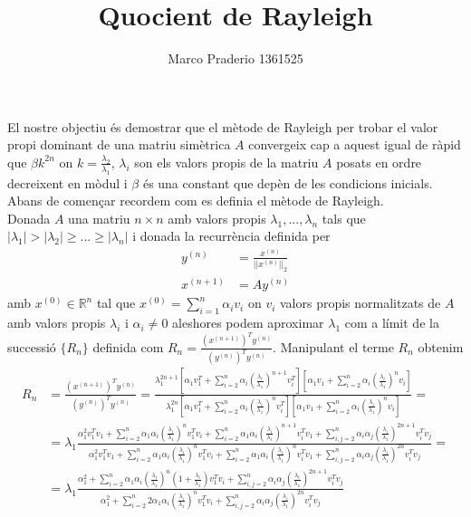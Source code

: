 \documentclass[a4paper,10pt]{article}
\title{Quocient de Rayleigh}
\author{Marco Praderio 1361525}
\date{}
\renewcommand{\*}{\cdot}
\renewcommand{\(}{\left(}
\renewcommand{\)}{\right)}
\newcommand{\R}{\mathbb{R}}
\begin{document}
\maketitle
El nostre objectiu és demostrar que el mètode de Rayleigh per trobar el valor propi dominant de una matriu simètrica $A$ convergeix cap a aquest igual de ràpid que 
$\beta k^{2n}$ on $k=\frac{\lambda_2}{\lambda_1}$, $\lambda_i$ son els valors propis de la matriu $A$ posats en ordre decreixent en mòdul i $\beta$ és una constant
que depèn de les condicions inicials.\\
Abans de començar recordem com es definia el mètode de Rayleigh.\\
Donada $A$ una matriu $n\times n$ amb valors propis $\lambda_1,...,\lambda_n$ tals que $|\lambda_1|>|\lambda_2|\ge\dots\ge|\lambda_n|$ i donada la
recurrència definida per
\begin{equation*}
 \begin{split}
  y^{(n)}&=\frac{x^{(n)}}{||x^{(n)}||_2}\\
  x^{(n+1)}&=Ay^{(n)}
 \end{split}
\end{equation*}
amb $x^{(0)}\in\R^n$ tal que $x^(0)=\sum_{i=1}^n\alpha_iv_i$ on $v_i$ valors propis normalitzats de $A$ amb valors propis $\lambda_i$ i $\alpha_i\not=0$ aleshores podem
aproximar $\lambda_1$ com a límit de la successió
$\{R_n\}$ definida com $R_n=\frac{\(x^{(n+1)}\right)^Ty^{(n)}}{\(y^{(n)}\right)^Ty^{(n)}}$. Manipulant el terme $R_n$ obtenim
\begin{equation*}
 \begin{split}
  R_n&=\frac{\(x^{(n+1)}\)^Ty^{(n)}}{\(y^{(n)}\)^Ty^{(n)}}=\frac{\lambda_1^{2n+1}\left[\alpha_1v_1^T+\sum_{i=2}^n\alpha_i\(\frac{\lambda_i}{\lambda_1}\)^{n+1}v_i^T\right]
  \left[\alpha_1v_1+\sum_{i=2}^n\alpha_i\(\frac{\lambda_i}{\lambda_1}\)^n v_i\right]}{\lambda_1^{2n}\left[\alpha_1v_1^T+\sum_{i=2}^n\alpha_i\(\frac{\lambda_i}{\lambda_1}\)
  ^n v_i^T\right]\left[\alpha_1v_1+\sum_{i=2}^n\alpha_i\(\frac{\lambda_i}{\lambda_1}\)^n v_i\right]}=\\
  &=\lambda_1\frac{\alpha_1^2v_1^Tv_1+\sum_{i=2}^n\alpha_1\alpha_i\(\frac{\lambda_i}{\lambda_1}\)^nv_1^Tv_i+\sum_{i=2}^n\alpha_1\alpha_i\(\frac{\lambda_i}{\lambda_1}\)^{n+1}
  v_i^Tv_1+\sum_{i,j=2}^n\alpha_i\alpha_j\(\frac{\lambda_i}{\lambda_1}\)^{2n+1}v_i^Tv_j}{\alpha_1^2v_1^Tv_1+\sum_{i=2}^n\alpha_1\alpha_i\(\frac{\lambda_i}{\lambda_1}\)^n
  v_1^Tv_i+\sum_{i=2}^n\alpha_1\alpha_i\(\frac{\lambda_i}{\lambda_1}\)^{n}v_i^Tv_1+\sum_{i,j=2}^n\alpha_i\alpha_j\(\frac{\lambda_i}{\lambda_1}\)^{2n}v_i^Tv_j}=\\
  &=\lambda_1\frac{\alpha_1^2+\sum_{i=2}^n\alpha_1\alpha_i\(\frac{\lambda_i}{\lambda_1}\)^n\(1+\frac{\lambda_i}{\lambda_1}\)v_1^Tv_i+
  \sum_{i,j=2}^n\alpha_i\alpha_j\(\frac{\lambda_i}{\lambda_1}\)^{2n+1}v_i^Tv_j}{\alpha_1^2+\sum_{i=2}^n2\alpha_1\alpha_i\(\frac{\lambda_i}{\lambda_1}\)^n
  v_1^Tv_i+\sum_{i,j=2}^n\alpha_i\alpha_j\(\frac{\lambda_i}{\lambda_1}\)^{2n}v_i^Tv_j}
 \end{split}
\end{equation*}
\end{document}
